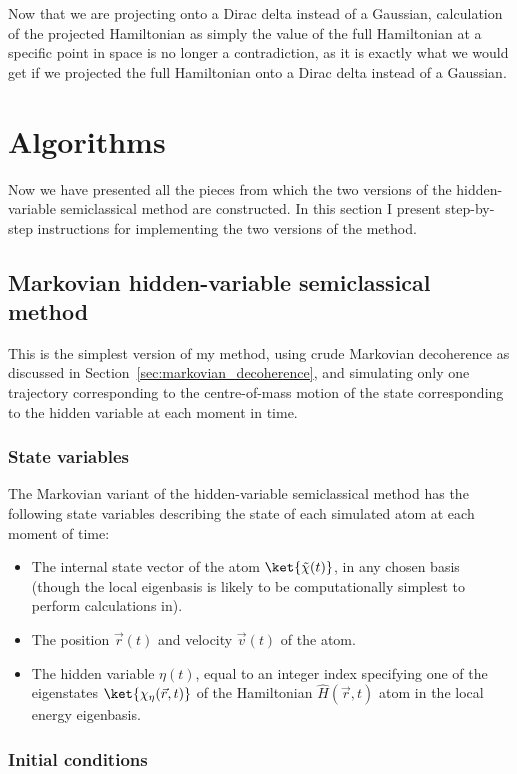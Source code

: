 Now that we are projecting onto a Dirac delta instead of a Gaussian, calculation of the projected Hamiltonian as simply the value of the full Hamiltonian at a specific point in space is no longer a contradiction, as it is exactly what we would get if we projected the full Hamiltonian onto a Dirac delta instead of a Gaussian.


\section{Algorithms}\label{sec:HVSC_algorithm}

Now we have presented all the pieces from which the two versions of the hidden-variable semiclassical method are constructed. In this section I present step-by-step instructions for implementing the two versions of the method.

\subsection{Markovian hidden-variable semiclassical method}
This is the simplest version of my method, using crude Markovian decoherence as discussed in Section~\ref{sec:markovian_decoherence}, and simulating only one trajectory corresponding to the centre-of-mass motion of the state corresponding to the hidden variable at each moment in time.

\subsubsection{State variables}
The Markovian variant of the hidden-variable semiclassical method has the following state variables describing the state of each simulated atom at each moment of time:
\begin{itemize}
    \item The internal state vector of the atom $\ket{\tilde\chi(t)}$, in any chosen basis (though the local eigenbasis is likely to be computationally simplest to perform calculations in).
    \item The position $\vec r(t)$ and velocity $\vec v(t)$ of the atom.
    \item The hidden variable $\eta(t)$, equal to an integer index specifying one of the eigenstates $\ket{\chi_\eta(\vec r, t)}$ of the Hamiltonian $\hat H(\vec r, t)$ atom in the local energy eigenbasis.
\end{itemize}

\subsubsection{Initial conditions}

